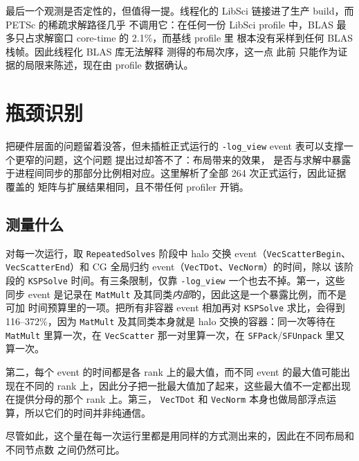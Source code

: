 \documentclass[11pt,a4paper,oneside]{report}
\let\OldSubsection\subsection
\renewcommand{\subsection}{\FloatBarrier\OldSubsection}
\begin{document}
最后一个观测是否定性的，但值得一提。线程化的 LibSci 链接进了生产 build，而 PETSc 的稀疏求解路径几乎
不调用它：在任何一份 LibSci profile 中，BLAS 最多只占求解窗口 core-time 的 2.1\%，而基线 profile 里
根本没有采样到任何 BLAS 栈帧。因此线程化 BLAS 库无法解释  测得的布局次序，这一点
此前  只能作为证据的局限来陈述，现在由 profile 数据确认。


\section{瓶颈识别}
\label{sec:bottleneck}
 把硬件层面的问题留着没答，但未插桩正式运行的 \texttt{-log\_view}
event 表可以支撑一个更窄的问题，这个问题  提出过却答不了：布局带来的效果，
是否与求解中暴露于进程间同步的那部分比例相对应。这里解析了全部 264 次正式运行，因此证据覆盖的
矩阵与扩展结果相同，且不带任何 profiler 开销。

\subsection{测量什么}
\label{sec:sync-measured}
对每一次运行，取 \texttt{RepeatedSolves} 阶段中 halo 交换 event（\texttt{VecScatterBegin}、
\texttt{VecScatterEnd}）和 CG 全局归约 event（\texttt{VecTDot}、\texttt{VecNorm}）的时间，除以
该阶段的 \texttt{KSPSolve} 时间。有三条限制，仅靠 \texttt{-log\_view} 一个也去不掉。第一，这些
同步 event 是记录在 \texttt{MatMult} 及其同类\emph{内部}的，因此这是一个暴露比例，而不是可加
时间预算里的一项。把所有非容器 event 相加再对 \texttt{KSPSolve} 求比，会得到 116--372\%，因为
\texttt{MatMult} 及其同类本身就是 halo 交换的容器：同一次等待在 \texttt{MatMult} 里算一次，在
\texttt{VecScatter} 那一对里算一次，在 \texttt{SFPack}/\texttt{SFUnpack} 里又算一次。

第二，每个 event 的时间都是各 rank 上的最大值，而不同 event 的最大值可能出现在不同的
rank 上，因此分子把一批最大值加了起来，这些最大值不一定都出现在提供分母的那个 rank 上。第三，
\texttt{VecTDot} 和 \texttt{VecNorm} 本身也做局部浮点运算，所以它们的时间并非纯通信。

尽管如此，这个量在每一次运行里都是用同样的方式测出来的，因此在不同布局和不同节点数
之间仍然可比。
\end{document}
